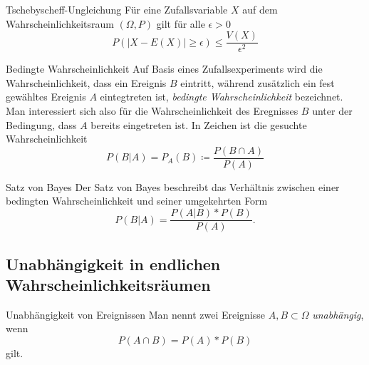 \begin{satz}{Tschebyscheff-Ungleichung}\label{tschebyscheff}
	Für eine Zufallsvariable $X$ auf dem Wahrscheinlichkeitsraum $(\Omega,P)$ gilt für alle $\epsilon>0$
	\begin{equation*}
		P(|X-E(X)|\geq \epsilon)\leq \frac{V(X)}{\epsilon^2}
	\end{equation*}
	
\end{satz}

\begin{definition}{Bedingte Wahrscheinlichkeit}
	Auf Basis eines Zufallsexperiments wird die Wahrscheinlichkeit, dass ein Ereignis $B$ eintritt, während zusätzlich ein fest gewähltes Ereignis $A$ eintegtreten ist, \emph{bedingte Wahrscheinlichkeit} bezeichnet. Man interessiert sich also für die Wahrscheinlichkeit des Eregnisses $B$ unter der Bedingung, dass $A$ bereits eingetreten ist. In Zeichen ist die gesuchte Wahrscheinlichkeit
	\begin{equation*}
		P(B|A)=P_A(B)\coloneqq\frac{P(B\cap A)}{P(A)}
	\end{equation*}
\end{definition}

\begin{definition}{Satz von Bayes}
	Der Satz von Bayes beschreibt das Verhältnis zwischen einer bedingten Wahrscheinlichkeit und seiner umgekehrten Form
	\begin{equation*}
		P(B|A)=\frac{P(A|B)*P(B)}{P(A)}.
	\end{equation*}
\end{definition}

\subsection{Unabhängigkeit in endlichen Wahrscheinlichkeitsräumen}
\begin{definition}{Unabhängigkeit von Ereignissen}
	Man nennt zwei Ereignisse $A,B\subset \Omega$ \emph{unabhängig}, wenn
	\begin{equation*}
		P(A\cap B)=P(A)*P(B)
	\end{equation*}
	gilt.
\end{definition}
